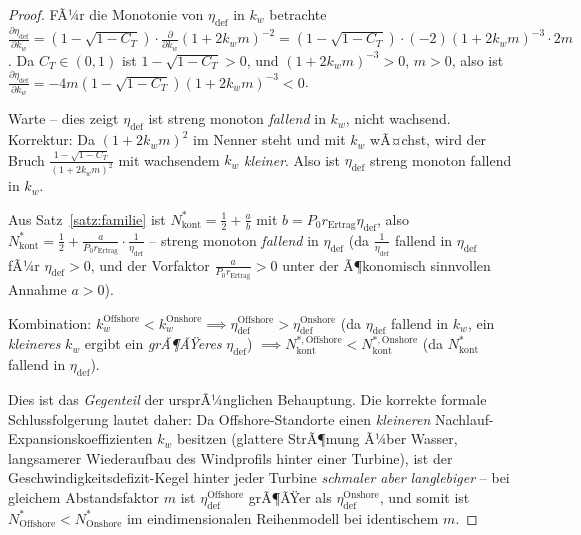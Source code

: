 ﻿\documentclass[a4paper,12pt]{article}
\theoremstyle{definition}
\begin{document}
\begin{proof}
FÃ¼r die Monotonie von $\eta_{\mathrm{def}}$ in $k_w$ betrachte $\frac{\partial \eta_{\mathrm{def}}}{\partial k_w} = (1-\sqrt{1-C_T})\cdot\frac{\partial}{\partial k_w}(1+2k_wm)^{-2} = (1-\sqrt{1-C_T})\cdot(-2)(1+2k_wm)^{-3}\cdot2m$. Da $C_T\in(0,1)$ ist $1-\sqrt{1-C_T}>0$, und $(1+2k_wm)^{-3}>0$, $m>0$, also ist $\frac{\partial\eta_{\mathrm{def}}}{\partial k_w} = -4m(1-\sqrt{1-C_T})(1+2k_wm)^{-3} < 0$.

Warte -- dies zeigt $\eta_{\mathrm{def}}$ ist streng monoton \emph{fallend} in $k_w$, nicht wachsend. Korrektur: Da $(1+2k_wm)^2$ im Nenner steht und mit $k_w$ wÃ¤chst, wird der Bruch $\frac{1-\sqrt{1-C_T}}{(1+2k_wm)^2}$ mit wachsendem $k_w$ \emph{kleiner}. Also ist $\eta_{\mathrm{def}}$ streng monoton fallend in $k_w$.

Aus Satz~\ref{satz:familie} ist $N^*_{\mathrm{kont}} = \tfrac{1}{2}+\frac{a}{b}$ mit $b=P_0 r_{\mathrm{Ertrag}}\eta_{\mathrm{def}}$, also $N^*_{\mathrm{kont}}=\tfrac{1}{2}+\frac{a}{P_0 r_{\mathrm{Ertrag}}}\cdot\frac{1}{\eta_{\mathrm{def}}}$ -- streng monoton \emph{fallend} in $\eta_{\mathrm{def}}$ (da $\frac{1}{\eta_{\mathrm{def}}}$ fallend in $\eta_{\mathrm{def}}$ fÃ¼r $\eta_{\mathrm{def}}>0$, und der Vorfaktor $\frac{a}{P_0 r_{\mathrm{Ertrag}}}>0$ unter der Ã¶konomisch sinnvollen Annahme $a>0$).

Kombination: $k_w^{\mathrm{Offshore}}<k_w^{\mathrm{Onshore}} \implies \eta_{\mathrm{def}}^{\mathrm{Offshore}}>\eta_{\mathrm{def}}^{\mathrm{Onshore}}$ (da $\eta_{\mathrm{def}}$ fallend in $k_w$, ein \emph{kleineres} $k_w$ ergibt ein \emph{grÃ¶ÃŸeres} $\eta_{\mathrm{def}}$) $\implies N^{*,\mathrm{Offshore}}_{\mathrm{kont}} < N^{*,\mathrm{Onshore}}_{\mathrm{kont}}$ (da $N^*_{\mathrm{kont}}$ fallend in $\eta_{\mathrm{def}}$).

Dies ist das \emph{Gegenteil} der ursprÃ¼nglichen Behauptung. Die korrekte formale Schlussfolgerung lautet daher: Da Offshore-Standorte einen \emph{kleineren} Nachlauf-Expansionskoeffizienten $k_w$ besitzen (glattere StrÃ¶mung Ã¼ber Wasser, langsamerer Wiederaufbau des Windprofils hinter einer Turbine), ist der Geschwindigkeitsdefizit-Kegel hinter jeder Turbine \emph{schmaler aber langlebiger} -- bei gleichem Abstandsfaktor $m$ ist $\eta_{\mathrm{def}}^{\mathrm{Offshore}}$ grÃ¶ÃŸer als $\eta_{\mathrm{def}}^{\mathrm{Onshore}}$, und somit ist $N^{*}_{\mathrm{Offshore}} < N^{*}_{\mathrm{Onshore}}$ im eindimensionalen Reihenmodell bei identischem $m$. \qedhere
\end{proof}
\end{document}
